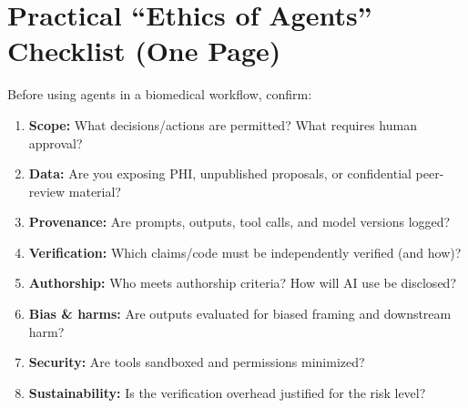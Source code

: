 \documentclass[11pt]{article}
\begin{document}
\section{Practical ``Ethics of Agents'' Checklist (One Page)}
Before using agents in a biomedical workflow, confirm:
\begin{enumerate}[leftmargin=*]
\item \textbf{Scope:} What decisions/actions are permitted? What requires human approval?
\item \textbf{Data:} Are you exposing PHI, unpublished proposals, or confidential peer-review material?
\item \textbf{Provenance:} Are prompts, outputs, tool calls, and model versions logged?
\item \textbf{Verification:} Which claims/code must be independently verified (and how)?
\item \textbf{Authorship:} Who meets authorship criteria? How will AI use be disclosed?
\item \textbf{Bias \& harms:} Are outputs evaluated for biased framing and downstream harm?
\item \textbf{Security:} Are tools sandboxed and permissions minimized?
\item \textbf{Sustainability:} Is the verification overhead justified for the risk level?
\end{enumerate}
\end{document}
